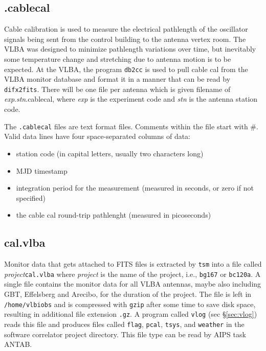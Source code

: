 
\subsection{.cablecal} \label{sec:cablecal}

Cable calibration is used to measure the electrical pathlength of the oscillator signals being sent from the control building to the antenna vertex room.
The VLBA was designed to minimize pathlength variations over time, but inevitably some temperature change and stretching due to antenna motion is to be expected.
At the VLBA, the program {\tt db2cc} is used to pull cable cal from the VLBA monitor database and format it in a manner that can be read by {\tt difx2fits}.
There will be one file per antenna which is given filename of {\it exp}.{\it stn}.cablecal, where {\it exp} is the experiment code and {\it stn} is the antenna station code.

The {\tt .cablecal} files are text format files.
Comments within the file start with \#.
Valid data lines have four space-separated columns of data:
\begin{itemize}
  \item station code (in capital letters, usually two characters long)
  \item MJD timestamp
  \item integration period for the measurement (measured in seconds, or zero if not specified)
  \item the cable cal round-trip pathlenght (measured in picoseconds)
\end{itemize}








\subsection{cal.vlba} \label{sec:cal}

Monitor data that gets attached to FITS files is extracted by {\tt tsm} into a file called {\em project}{\tt cal.vlba} where {\em project} is the name of the project, i.e., {\tt bg167} or {\tt bc120a}.
A single file contains the monitor data for all VLBA antennas, maybe also including GBT, Effelsberg and Arecibo, for the duration of the project.
The file is left in {\tt /home/vlbiobs} and is compressed with {\tt gzip} after some time to save disk space, resulting in additional file extension {\tt .gz}.
A program called {\tt vlog} (sec \S\ref{sec:vlog}) reads this file and produces files called {\tt flag}, {\tt pcal}, {\tt tsys}, and {\tt weather} in the software correlator project directory.
This file type can be read by AIPS task ANTAB.







